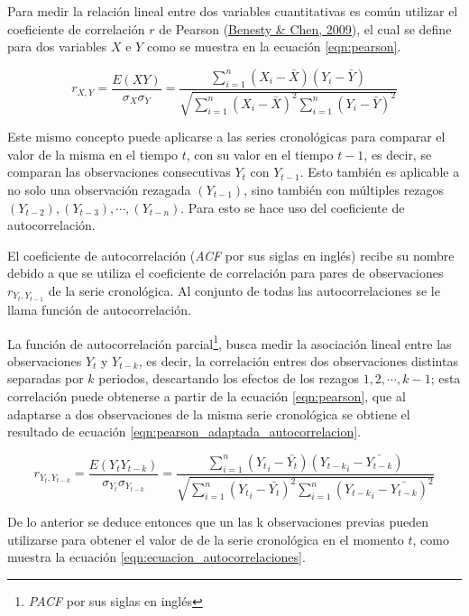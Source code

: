 \documentclass[
]{article}
\begin{document}
Para medir la relación lineal entre dos variables cuantitativas es común
utilizar el coeficiente de correlación \(r\) de Pearson
(\protect\hyperlink{ref-pearson}{Benesty \& Chen, 2009}), el cual se
define para dos variables \(X\) e \(Y\) como se muestra en la ecuación
\ref{eqn:pearson}.

\begin{equation}
\label{eqn:pearson}
r_{X,Y}=\frac{E(XY)}{\sigma_X \sigma_Y} = \frac{\sum_{i=1}^n \left(X_i- \bar X\right) \left(Y_i- \bar Y\right)}{\sqrt{\sum_{i=1}^n \left(X_i- \bar X\right)^2 \sum_{i=1}^n \left(Y_i- \bar Y\right)^2}}
\end{equation}

Este mismo concepto puede aplicarse a las series cronológicas para
comparar el valor de la misma en el tiempo \(t\), con su valor en el
tiempo \(t-1\), es decir, se comparan las observaciones consecutivas
\(Y_t\) con \(Y_{t-1}\). Esto también es aplicable a no solo una
observación rezagada \((Y_{t-1})\), sino también con múltiples rezagos
\((Y_{t-2}), (Y_{t-3}), \cdots,(Y_{t-n})\). Para esto se hace uso del
coeficiente de autocorrelación.

El coeficiente de autocorrelación (\emph{ACF} por sus siglas en inglés)
recibe su nombre debido a que se utiliza el coeficiente de correlación
para pares de observaciones \(r_{Y_t, Y_{t-1}}\) de la serie
cronológica. Al conjunto de todas las autocorrelaciones se le llama
función de autocorrelación.

La función de autocorrelación parcial\footnote{\emph{PACF} por sus
  siglas en inglés}, busca medir la asociación lineal entre las
observaciones \(Y_t\) y \(Y_{t-k}\), es decir, la correlación entres dos
observaciones distintas separadas por \(k\) periodos, descartando los
efectos de los rezagos \(1,2, \cdots ,k-1\); esta correlación puede
obtenerse a partir de la ecuación \ref{eqn:pearson}, que al adaptarse a
dos observaciones de la misma serie cronológica se obtiene el resultado
de ecuación \ref{eqn:pearson_adaptada_autocorrelacion}.

\begin{equation}
\label{eqn:pearson_adaptada_autocorrelacion}
r_{{Y_t},{Y_{t-k}}}=\frac{E({Y_t}{Y_{t-k}})}{\sigma_{Y_t} \sigma_{Y_{t-k}}} = \frac{\sum_{i=1}^n \left({Y_t}_i- \bar {Y_t}\right) \left({Y_{t-k}}_i- \bar {Y_{t-k}}\right)}{\sqrt{\sum_{i=1}^n \left({Y_t}_i- \bar {Y_t}\right)^2 \sum_{i=1}^n \left({Y_{t-k}}_i- \bar {Y_{t-k}}\right)^2}}
\end{equation}

De lo anterior se deduce entonces que un las k observaciones previas
pueden utilizarse para obtener el valor de de la serie cronológica en el
momento \(t\), como muestra la ecuación
\ref{eqn:ecuacion_autocorrelaciones}.
\end{document}
